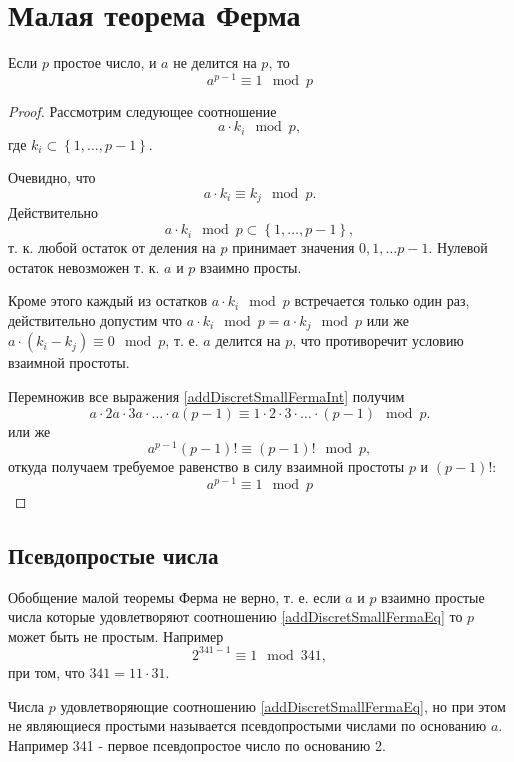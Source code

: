 \section{Малая теорема Ферма}

\begin{theorem}
\label{addDiscretSmallFerma}
Если $p$ простое число, и $a$ не делится на $p$, то 
\begin{equation}
a^{p-1} \equiv 1 \mod{p}
\label{addDiscretSmallFermaEq}
\end{equation}
\end{theorem}

\begin{proof}
Рассмотрим следующее соотношение
\[
a \cdot k_i \mod{p},
\]
где $k_i \subset \left\{1, \dots, p - 1\right\}$.

Очевидно, что 
\begin{equation}
a \cdot k_i \equiv k_j \mod{p}.
\label{addDiscretSmallFermaInt}
\end{equation}
Действительно
\[
a \cdot k_i \mod{p} \subset \left\{1, \dots, p - 1\right\},
\]
т. к. любой остаток от деления на $p$ принимает значения $0, 1, \dots
p-1$. Нулевой остаток невозможен т. к. $a$ и $p$ взаимно просты.

Кроме этого каждый из остатков $a \cdot k_i \mod{p}$ встречается
только один раз, действительно допустим что $a \cdot k_i \mod{p} = a
\cdot k_j \mod{p}$ или же $a \cdot \left( k_i - k_j \right ) \equiv 0
\mod{p}$, т. е. $a$ делится на $p$, что противоречит условию взаимной
простоты. 

Перемножив все выражения \autoref{addDiscretSmallFermaInt} получим
\[
a \cdot 2a \cdot 3a \cdot \dots \cdot a\left(p - 1\right) 
\equiv 1 \cdot 2 \cdot 3 \cdot \dots \cdot \left(p - 1\right) \mod{p}.
\]
или же
\[
a^{p-1} \left(p - 1\right)! \equiv \left(p - 1\right)! \mod{p},
\]
откуда получаем требуемое равенство в силу взаимной простоты $p$ и
$\left(p-1\right)!$:
\[
a^{p-1} \equiv 1 \mod{p}
\]
\end{proof}

\subsection{Псевдопростые числа}
Обобщение малой теоремы Ферма не верно, т. е.  если $a$ и $p$ взаимно
простые числа которые удовлетворяют соотношению
\autoref{addDiscretSmallFermaEq} то $p$ может быть не простым. Например
\[
2 ^ {341 - 1} \equiv 1 \mod{ 341 },
\] 
при том, что $341 = 11 \cdot 31$.

Числа $p$ удовлетворяющие соотношению \autoref{addDiscretSmallFermaEq},
но при этом не являющиеся простыми называется псевдопростыми числами
по основанию $a$. Например 341 - первое псевдопростое число по
основанию 2.
